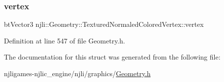\subsubsection{\texorpdfstring{vertex}{vertex}}
{\footnotesize\ttfamily bt\+Vector3 njli\+::\+Geometry\+::\+Textured\+Normaled\+Colored\+Vertex\+::vertex}



Definition at line 547 of file Geometry.\+h.



The documentation for this struct was generated from the following file\+:\begin{DoxyCompactItemize}
\item 
njligames-\/njlic\+\_\+engine/njli/graphics/\mbox{\hyperlink{_geometry_8h}{Geometry.\+h}}\end{DoxyCompactItemize}
